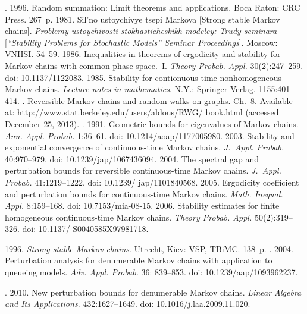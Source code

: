 \begin{multicols}{2}
{{\begin{thebibliography}{99}
. 1996. Random summation: Limit
theorems and applications. Boca Raton: CRC Press. 267~p.
 1981. Sil'no ustoychivye tsepi Markova
[Strong stable Markov chains].
\textit{Problemy ustoychivosti stokhasticheskikh modeley:
Trudy seminara} [\textit{``Stability Problems for Stochastic Models'' Seminar Proceedings}].
Moscow: VNIISI. 54--59.
 1986. Inequalities in theorems of ergodicity and stability for
Markov chains with common phase space.~I. \textit{Theory Probab. Appl.} 30(2):247--259.
doi: 10.1137/1122083.
 1985. Stability for contionuous-time nonhomogeneous
Markov chains. \textit{Lecture notes in mathematics}.  N.Y.: Springer Verlag. 1155:401--414.
.
Reversible Markov chains and random walks on graphs. Ch.~8.
Available at: {\sf http://www.stat.berkeley.edu/users/aldous/RWG/ book.html} (accessed December 25, 2013).
. 1991.
Geometric bounds for eigenvalues of Markov chains. \textit{Ann. Appl. Probab.} 1:36--61.
doi: 10.1214/aoap/1177005980.
 2003. Stability and exponential
convergence of continuous-time Markov chains. \textit{J.~Appl. Probab.} 40:970--979. doi: 10.1239/jap/1067436094.
 2004. The spectral gap and perturbation bounds for
reversible continuous-time Markov chains. \textit{J.~Appl. Probab.} 41:1219--1222. 
doi: 10.1239/ jap/1101840568.
 2005. Ergodicity coefficient and perturbation
bounds for continuous-time Markov chains. \textit{Math. Inequal. Appl.} 8:159--168. doi: 10.7153/mia-08-15.
 2006. Stability estimates for finite homogeneous
continuous-time Markov chains. \textit{Theory Probab. Appl.} 50(2):319--326. 
doi: 10.1137/ S0040585X97981718.

 1996. \textit{Strong stable Markov chains}. Utrecht, Kiev: VSP, TBiMC. 138~p.
. 2004.
Perturbation analysis for denumerable Markov chains with application to queueing models.
\textit{Adv. Appl. Probab.} 36: 839--853. doi: 10.1239/aap/1093962237.

. 2010.
New perturbation bounds for denumerable Markov chains.
\textit{Linear Algebra and Its Applications}. 432:1627--1649. doi: 10.1016/j.laa.2009.11.020.


\end{thebibliography}}}
\end{multicols}
